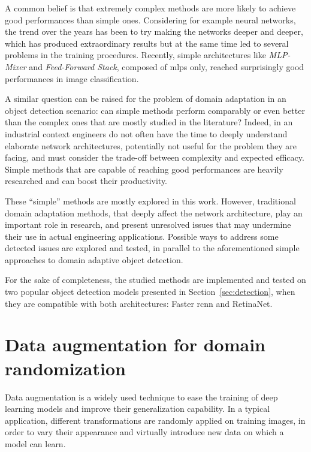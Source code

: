 \documentclass[%
    corpo=12pt,
    twoside,
    stile=classica,   
    tipotesi=magistrale,
    evenboxes,
    english,
	numerazioneromana,
]{toptesi}
\newcommand{\quotes}[1]{``#1''}
\begin{document}
\bigskip
A common belief is that extremely complex methods are more likely to achieve good performances than simple ones. Considering for example neural networks, the trend over the years has been to try making the networks deeper and deeper, which has produced extraordinary results but at the same time led to several problems in the training procedures. Recently, simple architectures like \textit{MLP-Mixer}\cite{tolstikhin2021mlpmixer} and \textit{Feed-Forward Stack}\cite{melaskyriazi2021need}, composed of \glspl{mlp} only, reached surprisingly good performances in image classification.

A similar question can be raised for the problem of domain adaptation in an object detection scenario: can simple methods perform comparably or even better than the complex ones that are mostly studied in the literature? Indeed, in an industrial context engineers do not often have the time to deeply understand elaborate network architectures, potentially not useful for the problem they are facing, and must consider the trade-off between complexity and expected efficacy. Simple methods that are capable of reaching good performances are heavily researched and can boost their productivity.

\bigskip
These \quotes{simple} methods are mostly explored in this work. However, traditional domain adaptation methods, that deeply affect the network architecture, play an important role in research, and present unresolved issues that may undermine their use in actual engineering applications. Possible ways to address some detected issues are explored and tested, in parallel to the aforementioned simple approaches to domain adaptive object detection.

\bigskip
For the sake of completeness, the studied methods are implemented and tested on two popular object detection models presented in Section~\ref{sec:detection}, when they are compatible with both architectures: Faster \gls{rcnn} and RetinaNet.

\section{Data augmentation for domain randomization}\label{sec:dataaug}
Data augmentation is a widely used technique to ease the training of deep learning models and improve their generalization capability. In a typical application, different transformations are randomly applied on training images, in order to vary their appearance and virtually introduce new data on which a model can learn.
\end{document}
